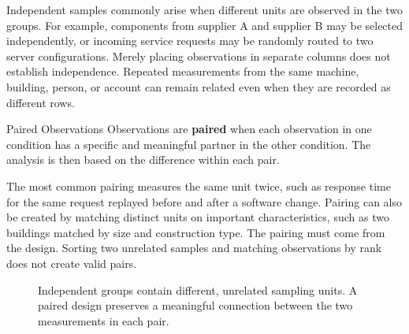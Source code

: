 Independent samples commonly arise when different units are observed in the two groups. For example, components from supplier A and supplier B may be selected independently, or incoming service requests may be randomly routed to two server configurations. Merely placing observations in separate columns does not establish independence. Repeated measurements from the same machine, building, person, or account can remain related even when they are recorded as different rows.

\begin{definition}{Paired Observations}
Observations are \textbf{paired} when each observation in one condition has a specific and meaningful partner in the other condition. The analysis is then based on the difference within each pair.
\end{definition}

The most common pairing measures the same unit twice, such as response time for the same request replayed before and after a software change. Pairing can also be created by matching distinct units on important characteristics, such as two buildings matched by size and construction type. The pairing must come from the design. Sorting two unrelated samples and matching observations by rank does not create valid pairs.

\begin{figure}[htbp]
\centering
{}
\caption{Independent groups contain different, unrelated sampling units. A paired design preserves a meaningful connection between the two measurements in each pair.}
\label{fig:independent-paired-designs}
\end{figure}

